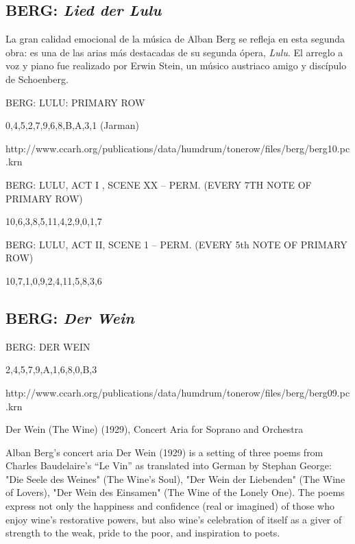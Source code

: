     	\subsection{BERG: \textit{Lied der Lulu}}
        	La gran calidad emocional de la música de Alban Berg se refleja en esta segunda obra: es una de las arias más destacadas de su segunda ópera, \textit{Lulu}. El arreglo a voz y piano fue realizado por Erwin Stein, un músico austriaco amigo y discípulo de Schoenberg.
        	
        	

BERG: LULU: PRIMARY ROW

{0,4,5,2,7,9,6,8,B,A,3,1} (Jarman)

http://www.ccarh.org/publications/data/humdrum/tonerow/files/berg/berg10.pc.krn


BERG: LULU, ACT I , SCENE XX -- PERM. (EVERY 7TH NOTE OF PRIMARY ROW)

{10,6,3,8,5,11,4,2,9,0,1,7}


BERG: LULU, ACT II, SCENE 1 -- PERM. (EVERY 5th NOTE OF PRIMARY ROW)

{10,7,1,0,9,2,4,11,5,8,3,6}
            
        
        \subsection{BERG: \textit{Der Wein}}
        
        BERG: DER WEIN
        
        {2,4,5,7,9,A,1,6,8,0,B,3}
        
        http://www.ccarh.org/publications/data/humdrum/tonerow/files/berg/berg09.pc.krn
        
        Der Wein (The Wine) (1929), Concert Aria for Soprano and Orchestra
        
        Alban Berg's concert aria Der Wein (1929) is a setting of three poems from Charles Baudelaire's ``Le Vin'' as translated into German by Stephan George: "Die Seele des Weines" (The Wine's Soul), "Der Wein der Liebenden" (The Wine of Lovers), "Der Wein des Einsamen" (The Wine of the Lonely One). The poems express not only the happiness and confidence (real or imagined) of those who enjoy wine's restorative powers, but also wine's celebration of itself as a giver of strength to the weak, pride to the poor, and inspiration to poets.

